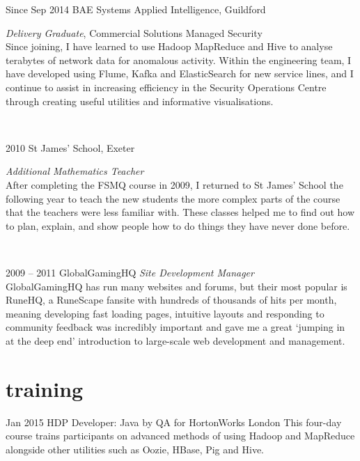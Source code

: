 \documentclass[]{friggeri-cv} %
\begin{document}
\begin{entrylist}
\entry
{{\footnotesize Since Sep 2014}}
{BAE Systems Applied Intelligence, Guildford}
{}
{\emph{Delivery Graduate}, Commercial Solutions Managed Security \\
Since joining, I have learned to use Hadoop MapReduce and Hive to analyse terabytes of network data for anomalous activity.  Within the engineering team, I have developed using Flume, Kafka and ElasticSearch for new service lines, and I continue to assist in increasing efficiency in the Security Operations Centre through creating useful utilities and informative visualisations.

~

}
\entry
{2010}
{St James' School, Exeter}
{}
{\emph{Additional Mathematics Teacher} \\
After completing the FSMQ course in 2009, I returned to St James' School the following year to teach the new students the more complex parts of the course that the teachers were less familiar with. These classes helped me to find out how to plan, explain, and show people how to do things they have never done before.

~

}
\entry
{2009 -- 2011}
{GlobalGamingHQ}
{}
{\emph{Site Development Manager} \\
GlobalGamingHQ has run many websites and forums, but their most popular is RuneHQ, a RuneScape fansite with hundreds of thousands of hits per month, meaning developing fast loading pages, intuitive layouts and responding to community feedback was incredibly important and gave me a great `jumping in at the deep end' introduction to large-scale web development and management.}
\end{entrylist}


\section{training}

\begin{entrylist}
\entry
{Jan 2015}
{HDP Developer: Java {\normalfont by QA for HortonWorks}}
{London}
{This four-day course trains participants on advanced methods of using Hadoop and MapReduce alongside other utilities such as Oozie, HBase, Pig and Hive.}
\end{entrylist}
\end{document}
